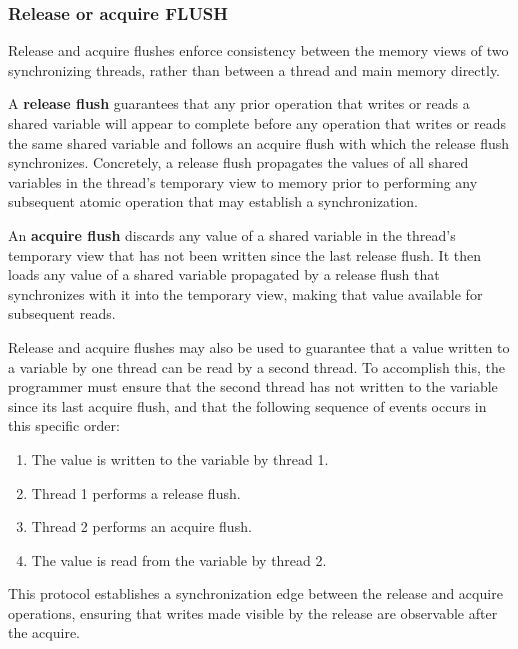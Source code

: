 \subsubsection{Release or acquire FLUSH}

Release and acquire flushes enforce consistency between the memory views of two synchronizing threads, rather than between a thread and main memory directly.

A \textbf{release flush} guarantees that any prior operation that writes or reads a shared variable will appear to complete before any operation that writes or reads the same shared variable and follows an acquire flush with which the release flush synchronizes. Concretely, a release flush propagates the values of all shared variables in the thread's temporary view to memory prior to performing any subsequent atomic operation that may establish a synchronization.

An \textbf{acquire flush} discards any value of a shared variable in the thread's temporary view that has not been written since the last release flush. It then loads any value of a shared variable propagated by a release flush that synchronizes with it into the temporary view, making that value available for subsequent reads.

Release and acquire flushes may also be used to guarantee that a value written to a variable by one thread can be read by a second thread. To accomplish this, the programmer must ensure that the second thread has not written to the variable since its last acquire flush, and that the following sequence of events occurs in this specific order:
\begin{enumerate}
    \item The value is written to the variable by thread 1.
    \item Thread 1 performs a release flush.
    \item Thread 2 performs an acquire flush.
    \item The value is read from the variable by thread 2.
\end{enumerate}
This protocol establishes a synchronization edge between the release and acquire operations, ensuring that writes made visible by the release are observable after the acquire.

